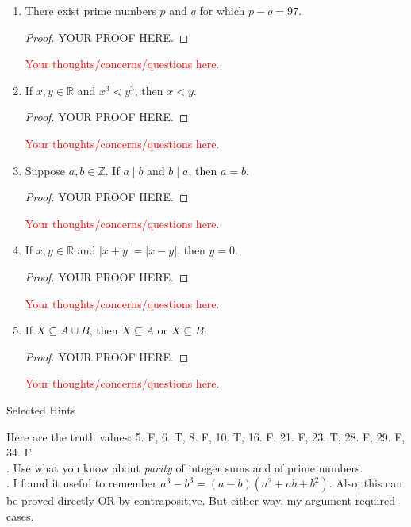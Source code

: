 \documentclass[11pt]{report}
\theoremstyle{plain}
\newcommand{\Z}{\mathbb{Z}}
\begin{document}
\begin{enumerate}
\begin{proof} YOUR PROOF HERE.
\end{proof}
\textcolor{red}{Your thoughts/concerns/questions here.}
\vspace{1in}
\item[\textbf{21.}] There exist prime numbers $p$ and $q$ for which $p - q = 97$.
\begin{proof} YOUR PROOF HERE.
\end{proof}
\textcolor{red}{Your thoughts/concerns/questions here.}
\vspace{1in}
\item[\textbf{23.}] If $x, y \in \mathbb{R}$ and $x^3 < y^3$, then $x < y$.
\begin{proof} YOUR PROOF HERE.
\end{proof}
\textcolor{red}{Your thoughts/concerns/questions here.}
\vspace{1in}
\item[\textbf{28.}] Suppose $a, b \in \Z$. If $a \mid b$ and $b \mid a$, then $a = b$.
\begin{proof} YOUR PROOF HERE.
\end{proof}
\textcolor{red}{Your thoughts/concerns/questions here.}
\vspace{1in}
\item[\textbf{29.}] If $x, y \in \mathbb{R}$ and $|x + y| = |x - y|$, then $y = 0$.
\begin{proof} YOUR PROOF HERE.
\end{proof}
\textcolor{red}{Your thoughts/concerns/questions here.}
\vspace{1in}
\item[\textbf{34.}] If $X \subseteq A \cup B$, then $X \subseteq A$ or $X \subseteq B$.
\begin{proof} YOUR PROOF HERE.
\end{proof}
\textcolor{red}{Your thoughts/concerns/questions here.}
\vspace{1in}
\end{enumerate}
\newpage
\begin{center} Selected Hints \end{center}
Here are the truth values:
5. F, 6. T, 8. F, 10. T, 16. F, 21. F, 23. T,  28. F, 29. F, 34. F\\

. Use what you know about \emph{parity} of integer sums and of prime numbers.\\

. I found it useful to remember $a^3-b^3=(a-b)(a^2+ab+b^2).$ Also, this can be proved directly OR by contrapositive. But either way, my argument required cases. 
\end{document}
